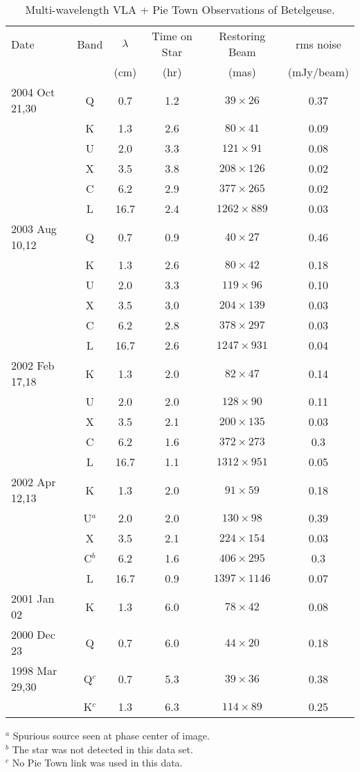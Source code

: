 \begin{table}[!ht]
\begin{center}
\caption[Multi-wavelength VLA + Pie Town Observations of Betelgeuse]
{Multi-wavelength VLA + Pie Town Observations of Betelgeuse.}
\begin{tabular}{lccccc}
\hline
\hline
\rule{0pt}{2.5ex} Date & Band&$\lambda$& Time on Star&Restoring Beam&rms noise\\
& & (cm)&  (hr) &(mas)&(mJy/beam)\\
\hline
\rule{0pt}{2.5ex}2004 Oct 21,30 & Q&0.7 & 1.2& $39\times 26$&0.37\\
 & K&1.3 & 2.6& $80\times 41$&0.09\\
 & U&2.0 & 3.3& $121\times 91$&0.08\\
 & X&3.5 & 3.8& $208\times 126$&0.02\\
 & C&6.2 & 2.9& $377\times 265$&0.02\\
 & L&16.7 & 2.4& $1262\times 889$&0.03\\
\hline
\rule{0pt}{2.5ex}2003 Aug 10,12& Q&0.7 & 0.9& $40 \times 27$&0.46\\
 & K&1.3 & 2.6& $80\times 42$&0.18\\
 & U&2.0 & 3.3& $119\times 96$&0.10\\
 & X&3.5 & 3.0& $204\times 139$&0.03\\
 & C&6.2 & 2.8& $378\times 297$&0.03\\
 & L&16.7 & 2.6& $1247\times 931$&0.04\\
\hline
\rule{0pt}{2.5ex}2002 Feb 17,18& K&1.3 & 2.0& $82\times 47$&0.14\\
 & U&2.0 & 2.0&$128\times 90$&0.11\\
 & X&3.5 & 2.1&$200\times 135$ &0.03\\
 & C&6.2 & 1.6& $372\times 273$&0.3\\
 & L&16.7 & 1.1&$1312\times 951$&0.05\\
\hline
\rule{0pt}{2.5ex}2002 Apr 12,13& K&1.3 & 2.0& $91\times 59$&0.18\\
 & U$^{a}$&2.0 & 2.0&$130\times 98$&0.39\\
 & X&3.5 & 2.1& $224\times 154$&0.03\\
 & C$^{b}$&6.2 &1.6 & $406\times 295$&0.3\\
 & L&16.7 & 0.9&$1397\times 1146$&0.07\\
\hline
\rule{0pt}{2.5ex}2001 Jan 02& K&1.3 & 6.0& $78\times 42$&0.08\\
\hline
\rule{0pt}{2.5ex}2000 Dec 23& Q&0.7 & 6.0& $44\times 20$&0.18\\
\hline
\rule{0pt}{2.5ex}1998 Mar 29,30& Q$^{c}$&0.7 & 5.3& $39\times 36$&0.38\\
 & K$^{c}$&1.3 & 6.3& $114\times 89$&0.25\\
\hline
\end{tabular}
\label{tab:3.8}
\begin{minipage}{14.0cm}
$^{a}$ Spurious source seen at phase center of image.\\
$^{b}$ The star was not detected in this data set.\\
$^{c}$ No Pie Town link was used in this data.
\end{minipage}
\end{center}
\end{table}
